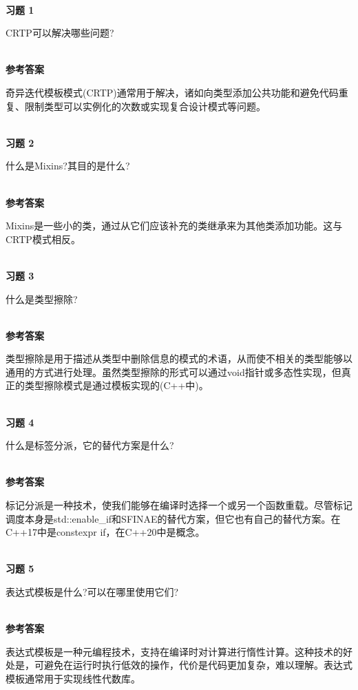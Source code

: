 \hspace*{\fill} \\ %
\noindent
\textbf{习题 1}

CRTP可以解决哪些问题?

\hspace*{\fill} \\ %
\noindent
\textbf{参考答案}

奇异迭代模板模式(CRTP)通常用于解决，诸如向类型添加公共功能和避免代码重复、限制类型可以实例化的次数或实现复合设计模式等问题。


\hspace*{\fill} \\ %
\noindent
\textbf{习题 2}

什么是Mixins?其目的是什么?

\hspace*{\fill} \\ %
\noindent
\textbf{参考答案}

Mixins是一些小的类，通过从它们应该补充的类继承来为其他类添加功能。这与CRTP模式相反。

\hspace*{\fill} \\ %
\noindent
\textbf{习题 3}

什么是类型擦除?

\hspace*{\fill} \\ %
\noindent
\textbf{参考答案}

类型擦除是用于描述从类型中删除信息的模式的术语，从而使不相关的类型能够以通用的方式进行处理。虽然类型擦除的形式可以通过void指针或多态性实现，但真正的类型擦除模式是通过模板实现的(C++中)。

\hspace*{\fill} \\ %
\noindent
\textbf{习题 4}

什么是标签分派，它的替代方案是什么?

\hspace*{\fill} \\ %
\noindent
\textbf{参考答案}

标记分派是一种技术，使我们能够在编译时选择一个或另一个函数重载。尽管标记调度本身是std::enable\_if和SFINAE的替代方案，但它也有自己的替代方案。在C++17中是constexpr if，在C++20中是概念。

\hspace*{\fill} \\ %
\noindent
\textbf{习题 5}

表达式模板是什么?可以在哪里使用它们?

\hspace*{\fill} \\ %
\noindent
\textbf{参考答案}

表达式模板是一种元编程技术，支持在编译时对计算进行惰性计算。这种技术的好处是，可避免在运行时执行低效的操作，代价是代码更加复杂，难以理解。表达式模板通常用于实现线性代数库。












